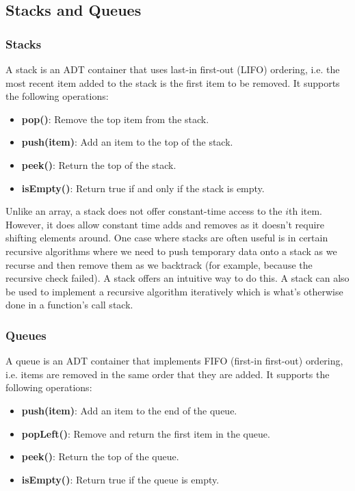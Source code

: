 \documentclass{article}
\begin{document}
    \subsection{Stacks and Queues}
    \subsubsection{Stacks}
    A stack is an ADT container that uses last-in first-out (LIFO) ordering, i.e. the most recent item added to the stack is the first item to be removed. It supports the following operations:
    \begin{itemize}
        \item  \textbf{pop()}: Remove the top item from the stack.
        \item  \textbf{push(item)}: Add an item to the top of the stack.
        \item \textbf{peek()}: Return the top of the stack.
        \item \textbf{isEmpty()}: Return true if and only if the stack is empty.
    \end{itemize}
    Unlike an array, a stack does not offer constant-time access to the $i$th item. However, it does allow constant time adds and removes as it doesn't require shifting elements around. One case where stacks are often useful is in certain recursive algorithms where we need to push temporary data onto a stack as we recurse and then remove them as we backtrack (for example, because the recursive check failed). A stack offers an intuitive way to do this. A stack can also be used to implement a recursive algorithm iteratively which is what's otherwise done in a function's call stack.
    
    \subsubsection{Queues}
    A queue is an ADT container that implements FIFO (first-in first-out) ordering, i.e. items are removed in the same order that they are added. It supports the following operations: 
    \begin{itemize}
        \item \textbf{push(item)}: Add an item to the end of the queue.
        \item \textbf{popLeft()}: Remove and return the first item in the queue.
        \item \textbf{peek()}: Return the top of the queue.
        \item \textbf{isEmpty()}: Return true if the queue is empty. 
    \end{itemize}
    
\end{document}
